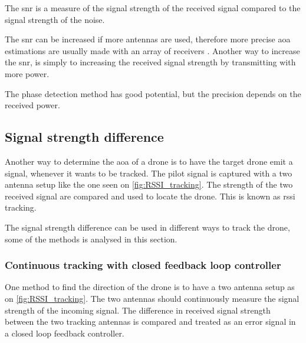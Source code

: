 The \gls{snr} is a measure of the signal strength of the received signal compared to the signal strength of the noise. 

The \gls{snr} can be increased if more antennas are used, therefore more precise \gls{aoa} estimations are usually made with an array of receivers \citep{book:shinohara}. Another way to increase the \gls{snr}, is simply to increasing the received signal strength by transmitting with more power. 

The phase detection method has good potential, but the precision depends on the received power. 

\subsection{Signal strength difference} \label{SignalStrengthDifference}
Another way to determine the \gls{aoa} of a drone is to have the target drone emit a signal, whenever it wants to be tracked. The pilot signal is captured with a two antenna setup like the one seen on \autoref{fig:RSSI_tracking}. The strength of the two received signal are compared and used to locate the drone. This is known as \gls{rssi} tracking. 


The signal strength difference can be used in different ways to track the drone, some of the methods is analysed in this section. 

\subsubsection{Continuous tracking with closed feedback loop controller}
One method to find the direction of the drone is to have a two antenna setup as on \autoref{fig:RSSI_tracking}. 
The two antennas should continuously measure the signal strength of the incoming signal. The difference in received signal strength between the two tracking antennas is compared and treated as an error signal in a closed loop feedback controller. 

